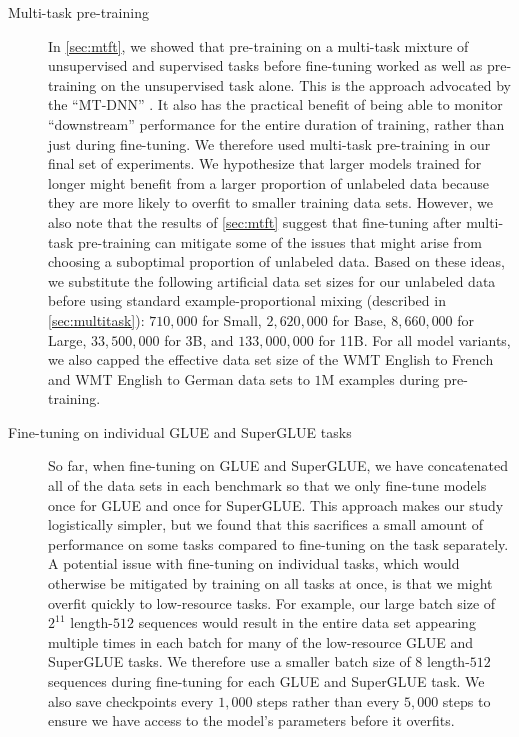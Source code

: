 \documentclass[twoside,11pt]{article}
\begin{document}
\begin{description}
\item[Multi-task pre-training] In \cref{sec:mtft}, we showed that pre-training on a multi-task mixture of unsupervised and supervised tasks before fine-tuning worked as well as pre-training on the unsupervised task alone.
This is the approach advocated by the ``MT-DNN'' \citep{liu2015representation,liu2019multi}.
It also has the practical benefit of being able to monitor ``downstream'' performance for the entire duration of training, rather than just during fine-tuning.
We therefore used multi-task pre-training in our final set of experiments.
We hypothesize that larger models trained for longer might benefit from a larger proportion of unlabeled data because they are more likely to overfit to smaller training data sets.
However, we also note that the results of \cref{sec:mtft} suggest that fine-tuning after multi-task pre-training can mitigate some of the issues that might arise from choosing a suboptimal proportion of unlabeled data.
Based on these ideas, we substitute the following artificial data set sizes for our unlabeled data before using standard example-proportional mixing (described in \cref{sec:multitask}): $710{,}000$ for Small, $2{,}620{,}000$ for Base, $8{,}660{,}000$ for Large, $33{,}500{,}000$ for 3B, and $133{,}000{,}000$ for 11B.
For all model variants, we also capped the effective data set size of the WMT English to French and WMT English to German data sets to $1\mathrm{M}$ examples during pre-training.

\item[Fine-tuning on individual GLUE and SuperGLUE tasks] So far, when fine-tuning on GLUE and SuperGLUE, we have concatenated all of the data sets in each benchmark so that we only fine-tune models once for GLUE and once for SuperGLUE.
This approach makes our study logistically simpler, but we found that this sacrifices a small amount of performance on some tasks compared to fine-tuning on the task separately.
A potential issue with fine-tuning on individual tasks, which would otherwise be mitigated by training on all tasks at once, is that we might overfit quickly to low-resource tasks.
For example, our large batch size of $2^{11}$ length-$512$ sequences would result in the entire data set appearing multiple times in each batch for many of the low-resource GLUE and SuperGLUE tasks.
We therefore use a smaller batch size of $8$ length-$512$ sequences during fine-tuning for each GLUE and SuperGLUE task.
We also save checkpoints every $1{,}000$ steps rather than every $5{,}000$ steps to ensure we have access to the model's parameters before it overfits.


\end{description}
\end{document}
